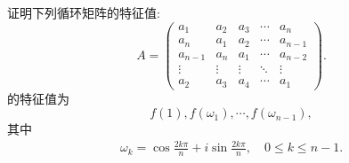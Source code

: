 \documentclass[../../main.tex]{subfiles}
\begin{document}
\begin{proposition}[循环矩阵的特征值]\label{proposition:循环矩阵的特征值}
证明下列循环矩阵的特征值:
\[
A = \begin{pmatrix}
a_1 & a_2 & a_3 & \cdots & a_n \\
a_n & a_1 & a_2 & \cdots & a_{n-1} \\
a_{n-1} & a_n & a_1 & \cdots & a_{n-2} \\
\vdots & \vdots & \vdots & \ddots & \vdots \\
a_2 & a_3 & a_4 & \cdots & a_1
\end{pmatrix}.
\]
的特征值为 $$f(1), f(\omega_1), \cdots, f(\omega_{n-1}),$$
其中
\begin{align*}
\omega_k = \cos \frac{2k\pi}{n} + i \sin \frac{2k\pi}{n}, \quad 0 \leqslant  k \leqslant  n - 1.
\end{align*}
\end{proposition}
\end{document}
